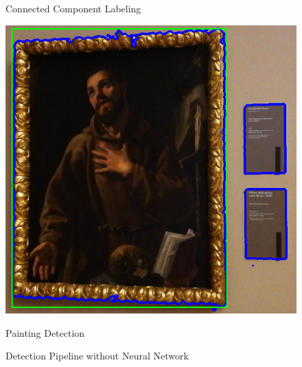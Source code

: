 \begin{figure}[h]
        \caption*{Connected Component Labeling}\label{fig:ccl}
      \endminipage\hfill
        \includegraphics[width=\linewidth]{pictures/painting_detection/6-bbox.PNG}
        \caption*{Painting Detection}\label{fig:bbox}
      \endminipage
      \caption{Detection Pipeline without Neural Network} \label{fig:pipeline_detection}
  \end{figure}
